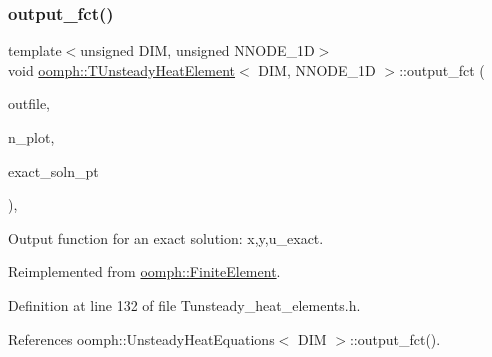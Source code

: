 \mbox{\label{classoomph_1_1TUnsteadyHeatElement_ab96efdf223b23caa747ca79dae88c847}} 
\subsubsection{\texorpdfstring{output\+\_\+fct()}{output\_fct()}\hspace{0.1cm}{\footnotesize\ttfamily [1/2]}}
{\footnotesize\ttfamily template$<$unsigned D\+IM, unsigned N\+N\+O\+D\+E\+\_\+1D$>$ \\
void \hyperlink{classoomph_1_1TUnsteadyHeatElement}{oomph\+::\+T\+Unsteady\+Heat\+Element}$<$ D\+IM, N\+N\+O\+D\+E\+\_\+1D $>$\+::output\+\_\+fct (\begin{DoxyParamCaption}\item[{std\+::ostream \&}]{outfile,  }\item[{const unsigned \&}]{n\+\_\+plot,  }\item[{\hyperlink{classoomph_1_1FiniteElement_a690fd33af26cc3e84f39bba6d5a85202}{Finite\+Element\+::\+Steady\+Exact\+Solution\+Fct\+Pt}}]{exact\+\_\+soln\+\_\+pt }\end{DoxyParamCaption})\hspace{0.3cm}{\ttfamily [inline]}, {\ttfamily [virtual]}}



Output function for an exact solution\+: x,y,u\+\_\+exact. 



Reimplemented from \hyperlink{classoomph_1_1FiniteElement_a22b695c714f60ee6cd145be348042035}{oomph\+::\+Finite\+Element}.



Definition at line 132 of file Tunsteady\+\_\+heat\+\_\+elements.\+h.



References oomph\+::\+Unsteady\+Heat\+Equations$<$ D\+I\+M $>$\+::output\+\_\+fct().

\mbox{\label{classoomph_1_1TUnsteadyHeatElement_af550a3be2cd261c495ee0c97a3ca29a7}} 

